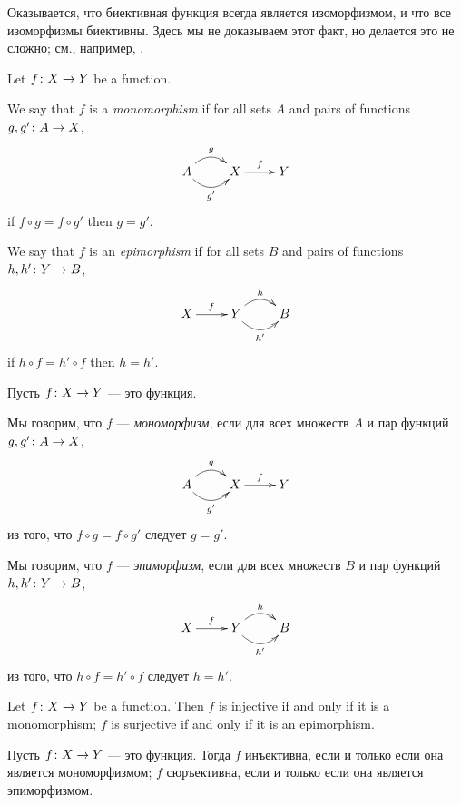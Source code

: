 \documentclass[CT4S-EN-RU]{subfiles}
\begin{document}
\begin{remarkRUS}
Оказывается, что биективная функция всегда является изоморфизмом, и что все изоморфизмы биективны. Здесь мы не доказываем этот факт, но делается это не сложно; см., например, \cite[Theorem 5.4]{Big}.
\end{remarkRUS}

\begin{definitionENG}\label{def:mono, epi in set}
Let $f\colon X\rightarrow Y$ be a function. 

We say that $f$ is a {\em monomorphism} if for all sets $A$ and pairs of functions $g,g'\colon A\rightarrow X$,
$$
\xymatrix{A\ar@/^1pc/[r]^g\ar@/_1pc/[r]_{g'}&X\ar[r]^f&Y}
$$
if $f\circ g=f\circ g'$ then $g=g'$.

We say that $f$ is an {\em epimorphism} if for all sets $B$ and pairs of functions $h,h'\colon Y\rightarrow B$, 
$$
\xymatrix{X\ar[r]^f&Y\ar@/^1pc/[r]^h\ar@/_1pc/[r]_{h'}&B}
$$
if $h\circ f=h'\circ f$ then $h=h'$.
\end{definitionENG}

\begin{definitionRUS}\label{def:mono, epi in set}
Пусть $f\colon X\rightarrow Y$ — это функция. 

Мы говорим, что $f$ — {\em мономорфизм}, если для всех множеств $A$ и пар функций $g,g'\colon A\rightarrow X$,
$$
\xymatrix{A\ar@/^1pc/[r]^g\ar@/_1pc/[r]_{g'}&X\ar[r]^f&Y}
$$
из того, что $f\circ g=f\circ g'$ следует $g=g'$.

Мы говорим, что $f$ — {\em эпиморфизм}, если для всех множеств $B$ и пар функций $h,h'\colon Y\rightarrow B$, 
$$
\xymatrix{X\ar[r]^f&Y\ar@/^1pc/[r]^h\ar@/_1pc/[r]_{h'}&B}
$$
из того, что $h\circ f=h'\circ f$ следует $h=h'$.
\end{definitionRUS}

\begin{propositionENG}\label{prop:inj and surj}
Let $f\colon X\rightarrow Y$ be a function. Then $f$ is injective if and only if it is a monomorphism; $f$ is surjective if and only if it is an epimorphism.
\end{propositionENG}

\begin{propositionRUS}\label{prop:inj and surj}
Пусть $f\colon X\rightarrow Y$ — это функция. Тогда $f$ инъективна, если и только если она является мономорфизмом; $f$ сюръективна, если и только если она является эпиморфизмом.
\end{propositionRUS}
\end{document}
